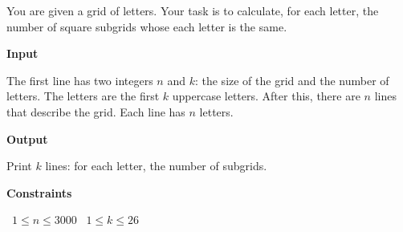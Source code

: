 You are given a grid of letters. Your task is to calculate, for each letter, the number of square subgrids whose each letter is the same.

\vspace{0.3cm}\noindent\textbf{Input}

The first line has two integers $n$ and $k$: the size of the grid and the number of letters. The letters are the first $k$ uppercase letters.
After this, there are $n$ lines that describe the grid. Each line has $n$ letters.

\vspace{0.3cm}\noindent\textbf{Output}

Print $k$ lines: for each letter, the number of subgrids.

\vspace{0.3cm}\noindent\textbf{Constraints}

\textbullet\ $1 \le n \le 3000$
\textbullet\ $1 \le k \le 26$